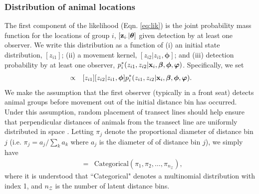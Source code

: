 \documentclass[aoas,preprint]{imsart}
\numberwithin{equation}{section}
\theoremstyle{plain}
\begin{document}
\subsubsection{Distribution of animal locations}

The first component of the likelihood (Eqn. \ref{eq:lik}) is the joint probability mass function for the locations of group $i$, $[{\bf z}_{i \cdot} |\boldsymbol{\theta}]$ given detection by at least one observer.  We write this distribution as a function of (i) an initial state distribution, $[z_{i1}]$; (ii) a movement kernel, $[z_{i2}|z_{i1},\boldsymbol{\phi}]$; and (iii) detection probability by at least one observer, $p_i^*(z_{i1},z_{i2}|{\bf x}_i,\boldsymbol{\beta},\boldsymbol{\phi},\boldsymbol{\varphi})$.  Specifically, we set
\begin{eqnarray*}
[{\bf z}_{i \cdot} |\boldsymbol{\theta}] & \propto & [z_{i1}][z_{i2}|z_{i1},\boldsymbol{\phi}]p_i^*(z_{i1},z_{i2}|{\bf x}_i,\boldsymbol{\beta},\boldsymbol{\phi},\boldsymbol{\varphi}).
\end{eqnarray*}
We make the assumption that the first observer (typically in a front seat) detects animal groups before movement out of the initial distance bin has occurred.  Under this assumption, random placement of transect lines should help ensure that perpendicular distances of animals from the transect line are uniformly distributed in space \citep[cf.][]{BucklandEtAl2001}.  Letting $\pi_j$ denote the proportional diameter of distance bin $j$ (i.e. $\pi_j = a_j / \sum_k a_k$ where $a_j$ is the diameter of of distance bin $j$), we simply have
\begin{eqnarray*}
  [z_{i1}] & = & \text{Categorical}(\pi_1,\pi_2,\hdots,\pi_{n_{\mathcal{Z}}}),
\end{eqnarray*}
where it is understood that ``Categorical" denotes a multinomial distribution with index 1, and $n_{\mathcal{Z}}$ is the number of latent distance bins.
\end{document}
